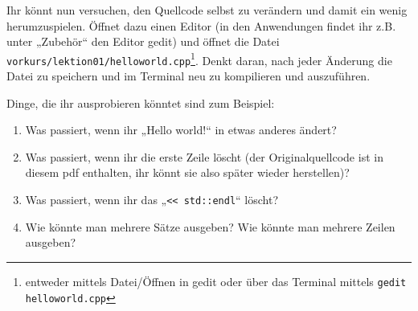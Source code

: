 
\begin{spiel}

    Ihr könnt nun versuchen, den Quellcode selbst zu verändern und damit ein wenig
    herumzuspielen. Öffnet dazu einen Editor (in den Anwendungen findet ihr z.B.
    unter „Zubehör“ den Editor gedit) und öffnet die Datei
    \texttt{vorkurs/lektion01/helloworld.cpp}\footnote{entweder mittels
        \glqq{}Datei/Öffnen\grqq{} in gedit oder über das Terminal mittels \texttt{gedit
            helloworld.cpp}}. Denkt daran, nach jeder Änderung die Datei zu speichern und
    im Terminal neu zu kompilieren und auszuführen.

    Dinge, die ihr ausprobieren könntet sind zum Beispiel:
    \begin{enumerate}
        \item Was passiert, wenn ihr „Hello world!“ in etwas anderes ändert?
        \item Was passiert, wenn ihr die erste Zeile löscht (der Originalquellcode
              ist in diesem pdf enthalten, ihr könnt sie also später wieder
              herstellen)?
        \item Was passiert, wenn ihr das „\verb|<< std::endl|“ löscht?
        \item Wie könnte man mehrere Sätze ausgeben? Wie könnte man mehrere Zeilen
              ausgeben?
    \end{enumerate}
\end{spiel}